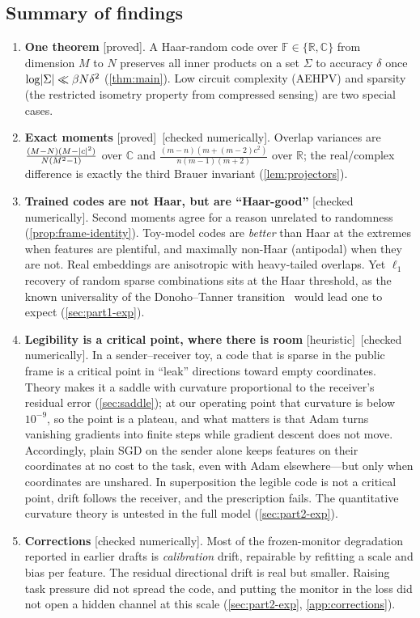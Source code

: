 \documentclass[11pt]{amsart}
\theoremstyle{plain}
\theoremstyle{definition}
\theoremstyle{remark}
\newcommand{\R}{\mathbb R}\newcommand{\C}{\mathbb C}\newcommand{\F}{\mathbb F}
\newcommand{\proved}{\textsf{\small[proved]}}
\newcommand{\numchk}{\textsf{\small[checked numerically]}}
\newcommand{\heur}{\textsf{\small[heuristic]}}
\begin{document}
\subsection*{Summary of findings}
\begin{enumerate}[leftmargin=*, itemsep=2pt]
\item \textbf{One theorem} \proved. A Haar-random code over $\F\in\{\R,\C\}$ from dimension $M$ to $N$ preserves
all inner products on a set $\Sigma$ to accuracy $\delta$ once $\log\lvert \Sigma\rvert\ll\beta N\delta^2$
(\cref{thm:main}). Low circuit complexity (AEHPV) and sparsity (the
restricted isometry property from compressed sensing) are two special cases.
\item \textbf{Exact moments} \proved\ \numchk. Overlap variances are $\frac{(M-N)(M-\lvert c\rvert^2)}{N(M^2-1)}$ over
$\C$ and $\frac{(m-n)(m+(m-2)c^2)}{n(m-1)(m+2)}$ over $\R$; the real/complex difference is exactly the third
Brauer invariant (\cref{lem:projectors}).
\item \textbf{Trained codes are not Haar, but are ``Haar-good''} \numchk. Second moments agree for a reason
unrelated to randomness (\cref{prop:frame-identity}). Toy-model codes are \emph{better} than Haar at the extremes
when features are plentiful, and maximally non-Haar (antipodal) when they are not. Real embeddings are
anisotropic with heavy-tailed overlaps. Yet $\ell_1$ recovery of random sparse combinations sits at the Haar threshold, as the known universality of the
Donoho--Tanner transition~\cite{Monajemi} would lead one to expect (\cref{sec:part1-exp}).
\item \textbf{Legibility is a critical point, where there is room} \heur\ \numchk. In a sender--receiver toy, a
code that is sparse in the public frame is a critical point in ``leak'' directions toward empty coordinates. Theory
makes it a saddle with curvature proportional to the receiver's residual error (\cref{sec:saddle}); at our operating
point that curvature is below $10^{-9}$, so the point is a plateau, and what matters is that Adam turns vanishing
gradients into finite steps while gradient descent does not move. Accordingly, plain SGD on the sender alone keeps
features on their coordinates at no cost to the task, even with Adam elsewhere---but only when coordinates are
unshared. In superposition the legible code is not a critical point, drift follows the receiver, and the prescription
fails. The quantitative curvature theory is untested in the full model (\cref{sec:part2-exp}).
\item \textbf{Corrections} \numchk. Most of the frozen-monitor degradation reported in earlier drafts is
\emph{calibration} drift, repairable by refitting a scale and bias per feature. The residual directional drift is
real but smaller. Raising task pressure did not spread the code, and putting the monitor in the loss did not open a
hidden channel at this scale (\cref{sec:part2-exp}, \cref{app:corrections}).
\end{enumerate}
\end{document}
